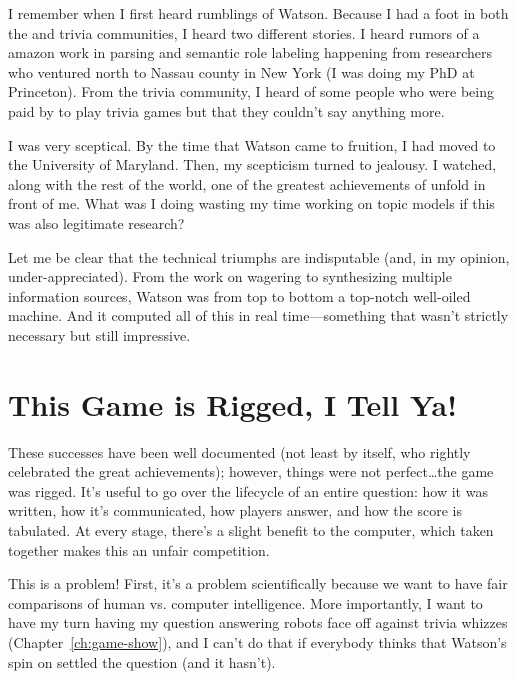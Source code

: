 

I remember when I first heard rumblings of Watson.
%
Because I had a foot in both the  and trivia communities, I
heard two different stories.
%
I heard rumors of a amazon work in parsing and semantic role labeling
happening from researchers who ventured north to Nassau county in New
York (I was doing my PhD at Princeton).
%
From the trivia community, I heard of some people who were being paid
by  to play trivia games but that they couldn't say anything
more.

I was very sceptical.
%
By the time that Watson came to fruition, I had moved to the
University of Maryland.
%
Then, my scepticism turned to jealousy.
%
I watched, along with the rest of the world, one of the greatest
achievements of  unfold in front of me.
%
What was I doing wasting my time working on topic models if this was
also legitimate research?

Let me be clear that the technical triumphs are indisputable (and, in
my opinion, under-appreciated).
%
From the work on wagering to synthesizing multiple information
sources, Watson was from top to bottom a top-notch well-oiled machine.
%
And it computed all of this in real time---something that wasn't
strictly necessary but still impressive.

\section{This Game is Rigged, I Tell Ya!}

These successes have been well documented (not least by 
itself, who rightly celebrated the great achievements); however,
things were not perfect\dots the game was rigged.
%
It's useful to go over the lifecycle of an entire question: how it was
written, how it's communicated, how players answer, and how the score
is tabulated.
%
At every stage, there's a slight benefit to the computer, which taken
together makes this an unfair competition.

This is a problem!  First, it's a problem scientifically because we
want to have fair comparisons of human vs. computer intelligence.
%
More importantly, I want to have my turn having my question answering
robots face off against trivia whizzes (Chapter~\ref{ch:game-show}),
and I can't do that if everybody thinks that Watson's spin
on \jeopardy{} settled the question (and it hasn't).


